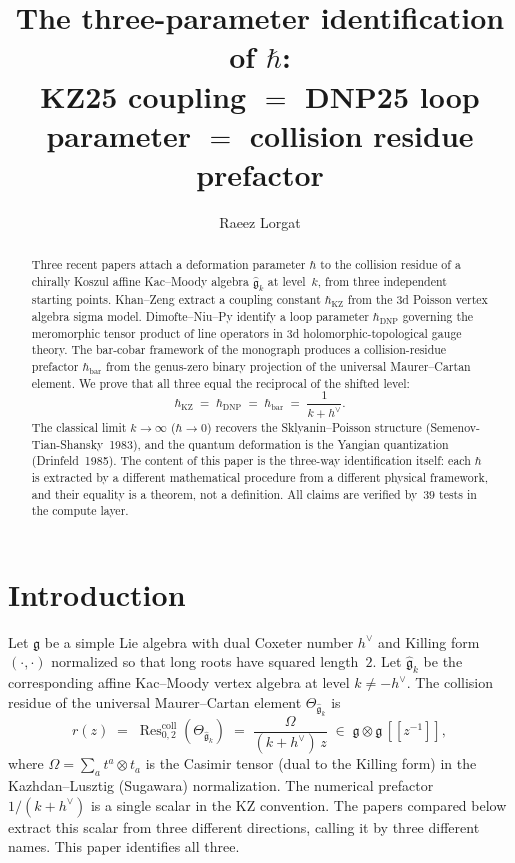 \documentclass[11pt]{article}
\title{The three-parameter identification of $\hbar$:\\
KZ25 coupling $=$ DNP25 loop parameter $=$ collision residue prefactor}
\author{Raeez Lorgat}
\date{}
\theoremstyle{plain}
\theoremstyle{definition}
\theoremstyle{remark}
\newcommand{\fg}{\mathfrak{g}}
\newcommand{\Res}{\operatorname{Res}}
\numberwithin{equation}{section}
\begin{document}
\maketitle


\begin{abstract}
Three recent papers attach a deformation parameter $\hbar$ to the
collision residue of a chirally Koszul affine Kac--Moody algebra
$\widehat{\fg}_k$ at level~$k$, from three independent starting
points. Khan--Zeng \cite{KZ25} extract a coupling constant
$\hbar_{\mathrm{KZ}}$ from the $3$d Poisson vertex algebra sigma
model. Dimofte--Niu--Py \cite{DNP25} identify a loop parameter
$\hbar_{\mathrm{DNP}}$ governing the meromorphic tensor product
of line operators in $3$d holomorphic-topological gauge theory.
The bar-cobar framework of the monograph \cite{Lorgat2026a} produces
a collision-residue prefactor $\hbar_{\mathrm{bar}}$ from the
genus-zero binary projection of the universal Maurer--Cartan element.
We prove that all three equal the reciprocal of the shifted level:
\[
 \hbar_{\mathrm{KZ}}
 \;=\;
 \hbar_{\mathrm{DNP}}
 \;=\;
 \hbar_{\mathrm{bar}}
 \;=\;
 \frac{1}{k + h^\vee}.
\]
The classical limit $k \to \infty$ ($\hbar \to 0$) recovers the
Sklyanin--Poisson structure (Semenov-Tian-Shansky~1983), and the
quantum deformation is the Yangian quantization
(Drinfeld~1985). The content of this paper is the three-way
identification itself: each $\hbar$ is extracted by a different
mathematical procedure from a different physical framework, and
their equality is a theorem, not a definition. All claims are
verified by~$39$ tests in the compute layer.
\end{abstract}

\section{Introduction}\label{sec:intro}

Let $\fg$ be a simple Lie algebra with dual Coxeter number
$h^\vee$ and Killing form $(\cdot, \cdot)$ normalized so that long
roots have squared length~$2$. Let $\widehat{\fg}_k$ be the
corresponding affine Kac--Moody vertex algebra at level
$k \neq -h^\vee$. The collision residue of the universal
Maurer--Cartan element $\Theta_{\widehat{\fg}_k}$ is
\begin{equation}\label{eq:km-collision-residue}
 r(z)
 \;=\;
 \Res^{\mathrm{coll}}_{0,2}(\Theta_{\widehat{\fg}_k})
 \;=\;
 \frac{\Omega}{(k + h^\vee) \, z}
 \;\in\;
 \fg \otimes \fg \, [\![z^{-1}]\!],
\end{equation}
where $\Omega = \sum_a t^a \otimes t_a$ is the Casimir tensor (dual
to the Killing form) in the Kazhdan--Lusztig (Sugawara) normalization.
The numerical prefactor $1/(k + h^\vee)$ is a single scalar in the
KZ convention. The papers compared below extract this scalar from
three different directions,
calling it by three different names. This paper identifies all three.
\end{document}
